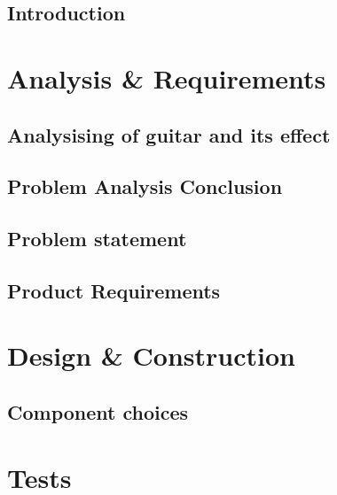\glsresetall
 \graphicspath{{figures/analysing/}}
\chapter{Introduction}

\part{Analysis \& Requirements}\label{pt:analysis} \glsresetall
 \graphicspath{{figures/analysing/}}
 \chapter{Analysising of guitar and its effect}\label{ch:analysing}
 
 

\label{sec:platform_comparing}
 \label{sec:FPGA}
 \label{sec:digital_vs_analog}
\chapter{Problem Analysis Conclusion}

\chapter{Problem statement}

\chapter{Product Requirements}








\part{Design \& Construction}\label{pt:design} 
\graphicspath{{figures/design/}}
\chapter{Component choices}


\part{Tests}\label{pt:tests} 
